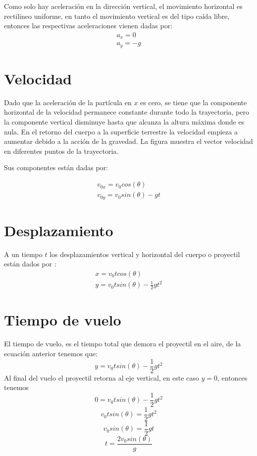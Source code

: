 \documentclass[12pt,a4paper]{article}
\begin{document}
Como solo hay aceleración en la dirección vertical, el movimiento horizontal es rectilineo uniforme, en tanto el  movimiento vertical es del tipo caída libre, entonces las respectivas aceleraciones vienen dadas por:
\begin{eqnarray}
a_{x} =0\\
a_{y} =-g
\end{eqnarray}

\section{Velocidad}
Dado que la aceleración de la partícula en $x$ es cero, se tiene que la componente horizontal de la velocidad permanece constante durante todo la trayectoria, pero la componente vertical disminuye  hasta que alcanza la altura máxima donde es nula. En el retorno del cuerpo a la superficie terrestre la velocidad empieza a aumentar debido a la acción de la gravedad. La figura muestra el vector velocidad en diferentes puntos de la trayectoria.

Sus componentes están dadas por:

\begin{eqnarray}
v_{0x} =v_{0} cos (\theta)\\
v_{0y} =v_{0} sin (\theta)- g t
\end{eqnarray}

\section{Desplazamiento}
A un tiempo $t$ los desplazamientos vertical y horizontal del cuerpo o proyectil están dados por :
\begin{eqnarray}
x = v_{0} t cos (\theta)\\
y = v_{0} t sin (\theta) - \frac{1}{2} g t^2
\end{eqnarray}

\section{Tiempo de vuelo}
El tiempo de vuelo, es el tiempo total que demora el proyectil  en el aire, de la ecuación anterior tenemos que:
\begin{equation}
y = v_{0} t sin (\theta) - \frac{1}{2} g t^2 \nonumber
\end{equation}
Al final del vuelo el proyectil retorna al eje vertical, en este caso $y=0$, entonces tenemos 
\begin{equation}
0 = v_{0} t sin (\theta) - \frac{1}{2} g t^2 \nonumber
\end{equation}
\begin{equation}
v_{0} t sin (\theta) = \frac{1}{2} g t^2\nonumber
\end{equation}
\begin{equation}
v_{0} sin (\theta) = \frac{1}{2} g t \nonumber
\end{equation}
\begin{equation}
t = \frac{2v_{0}sin (\theta)}{g}
\end{equation}
\end{document}
